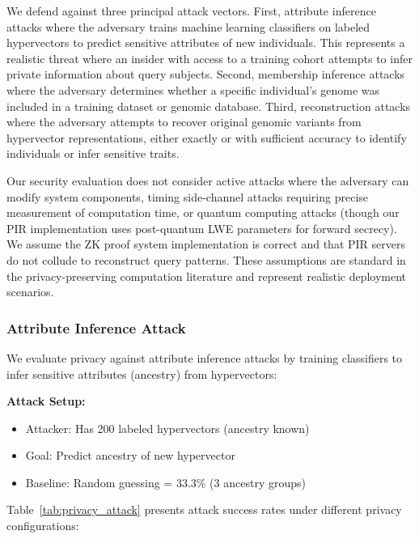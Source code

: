 \documentclass[11pt,letterpaper]{article}
\begin{document}
We defend against three principal attack vectors. First, attribute inference attacks where the adversary trains machine learning classifiers on labeled hypervectors to predict sensitive attributes of new individuals. This represents a realistic threat where an insider with access to a training cohort attempts to infer private information about query subjects. Second, membership inference attacks where the adversary determines whether a specific individual's genome was included in a training dataset or genomic database. Third, reconstruction attacks where the adversary attempts to recover original genomic variants from hypervector representations, either exactly or with sufficient accuracy to identify individuals or infer sensitive traits.

Our security evaluation does not consider active attacks where the adversary can modify system components, timing side-channel attacks requiring precise measurement of computation time, or quantum computing attacks (though our PIR implementation uses post-quantum LWE parameters for forward secrecy). We assume the ZK proof system implementation is correct and that PIR servers do not collude to reconstruct query patterns. These assumptions are standard in the privacy-preserving computation literature and represent realistic deployment scenarios.

\subsubsection{Attribute Inference Attack}

We evaluate privacy against attribute inference attacks by training classifiers to infer sensitive attributes (ancestry) from hypervectors:

\textbf{Attack Setup:}
\begin{itemize}
\item Attacker: Has 200 labeled hypervectors (ancestry known)
\item Goal: Predict ancestry of new hypervector
\item Baseline: Random guessing = 33.3\% (3 ancestry groups)
\end{itemize}

Table~\ref{tab:privacy_attack} presents attack success rates under different privacy configurations:
\end{document}
